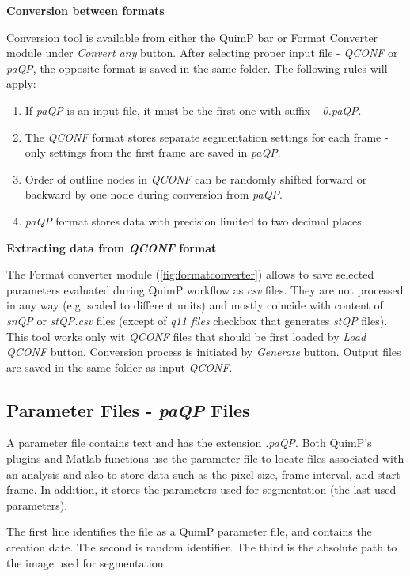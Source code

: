 \documentclass[a4paper,12pt]{article}
\begin{document}
\textbf{Conversion between formats}

Conversion tool is available from either the QuimP bar or Format Converter module under \textit{Convert any} button. After selecting proper input file - \textit{QCONF} or \textit{paQP}, the opposite format is saved in the same folder. The following rules will apply:
\begin{enumerate}
	\item If \textit{paQP} is an input file, it must be the first one with suffix \textit{\_0.paQP}.
	\item The \textit{QCONF} format stores separate segmentation settings for each frame - only settings from the first frame are saved in \textit{paQP}. 
	\item Order of outline nodes in \textit{QCONF} can be randomly shifted forward or backward by one node during conversion from \textit{paQP}. 
	\item \textit{paQP} format stores data with precision limited to two decimal places.
\end{enumerate}

\textbf{Extracting data from \textit{QCONF} format}

The Format converter module (\autoref{fig:formatconverter}) allows to save selected parameters evaluated during QuimP workflow as \textit{csv} files. They are not processed in any way (e.g. scaled to different units) and mostly coincide with content of \textit{snQP} or \textit{stQP.csv} files (except of \textit{q11 files} checkbox that generates \textit{stQP} files). This tool works only wit \textit{QCONF} files that should be first loaded by \textit{Load QCONF} button. Conversion process is initiated by \textit{Generate} button. Output files are saved in the same folder as input \textit{QCONF}.    
  
\subsection{Parameter Files - \textit{paQP} Files}
\label{paQP}

A parameter file contains text and has the extension \textit{.paQP}.  Both QuimP's plugins and
Matlab functions use the parameter file to locate files associated with an analysis and also to store data such as the
pixel size, frame interval, and start frame.  In addition, it stores the parameters used for segmentation
(the last used parameters).

The first line identifies the file as a QuimP parameter file, and contains the creation date.
The second is random identifier.
The third is the absolute path to the image used for segmentation.
 
\end{document}
